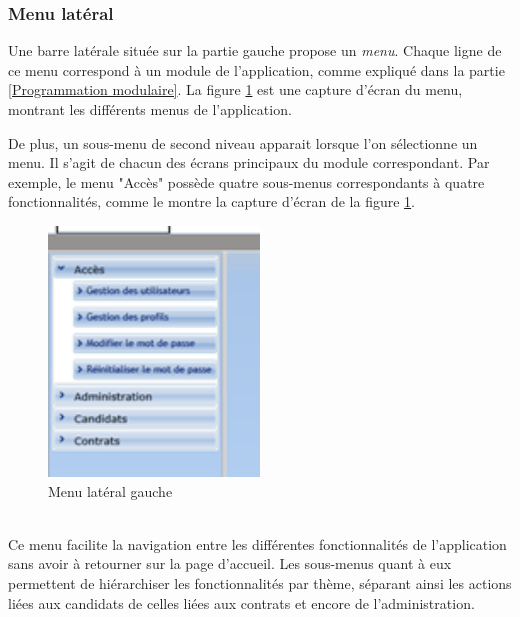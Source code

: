\subsubsection{Menu latéral}

Une barre latérale située sur la partie gauche propose un \textit{menu}.
Chaque ligne de ce menu correspond à un module de l'application, comme expliqué dans la partie \ref{Programmation modulaire}.
La figure \ref{menu} est une capture d'écran du menu, montrant les différents menus de l'application.

De plus, un sous-menu de second niveau apparait lorsque l'on sélectionne un menu.
Il s'agit de chacun des écrans principaux du module correspondant.
Par exemple, le menu "Accès" possède quatre sous-menus correspondants à quatre fonctionnalités, comme le montre la capture d'écran de la figure \ref{menu}.

\begin{figure}[!h]
	\center
	\includegraphics[width=0.5\textwidth]{img/menu.png}
	\caption{Menu latéral gauche}
	\label{menu}
\end{figure}
~~\\

Ce menu facilite la navigation entre les différentes fonctionnalités de l'application sans avoir à retourner sur la page d'accueil.
Les sous-menus quant à eux permettent de hiérarchiser les fonctionnalités par thème, séparant ainsi les actions liées aux candidats de celles liées aux contrats et encore de l'administration.


